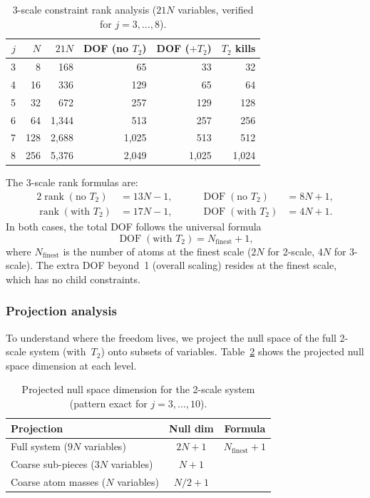 \documentclass[11pt,a4paper]{article}
\begin{document}
\begin{table}[h]
\centering
\caption{3-scale constraint rank analysis ($21N$ variables,
  verified for $j = 3, \ldots, 8$).}
\label{tab:lift3}
\begin{tabular}{rrrrrr}
\toprule
$j$ & $N$ & $21N$ & DOF (no $T_2$) & DOF ($+T_2$) & $T_2$ kills \\
\midrule
3 &    8 &    168 &    65 &    33 &    32 \\
4 &   16 &    336 &   129 &    65 &    64 \\
5 &   32 &    672 &   257 &   129 &   128 \\
6 &   64 &  1{,}344 &   513 &   257 &   256 \\
7 &  128 &  2{,}688 & 1{,}025 &   513 &   512 \\
8 &  256 &  5{,}376 & 2{,}049 & 1{,}025 & 1{,}024 \\
\bottomrule
\end{tabular}
\end{table}

The 3-scale rank formulas are:
\begin{alignat*}{2}
\operatorname{rank}(\text{no } T_2) &= 13N - 1,
  &\qquad \operatorname{DOF}(\text{no } T_2) &= 8N + 1, \\
\operatorname{rank}(\text{with } T_2) &= 17N - 1,
  &\qquad \operatorname{DOF}(\text{with } T_2) &= 4N + 1.
\end{alignat*}
In both cases, the total DOF follows the universal formula
\begin{equation}
\label{eq:dof}
\operatorname{DOF}(\text{with } T_2)
= N_{\text{finest}} + 1,
\end{equation}
where $N_{\text{finest}}$ is the number of atoms at the finest scale
($2N$ for 2-scale, $4N$ for 3-scale).
The extra DOF beyond~1 (overall scaling) resides at the finest scale,
which has no child constraints.

\subsubsection*{Projection analysis}

To understand where the freedom lives, we project the null space
of the full 2-scale system (with~$T_2$) onto subsets of variables.
Table~\ref{tab:proj} shows the projected null space dimension at
each level.

\begin{table}[h]
\centering
\caption{Projected null space dimension for the 2-scale system
  (pattern exact for $j = 3, \ldots, 10$).}
\label{tab:proj}
\begin{tabular}{lcc}
\toprule
Projection & Null dim & Formula \\
\midrule
Full system ($9N$ variables) & $2N + 1$ & $N_{\text{finest}} + 1$ \\
Coarse sub-pieces ($3N$ variables) & $N + 1$ & \\
Coarse atom masses ($N$ variables) & $N/2 + 1$ & \\
\bottomrule
\end{tabular}
\end{table}
\end{document}
